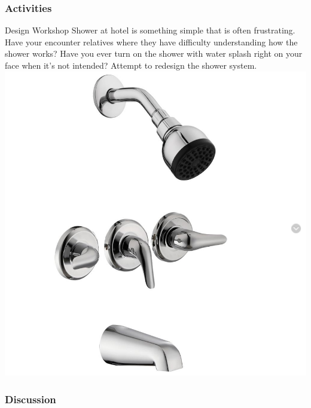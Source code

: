 \documentclass{beamer}
\begin{document}

\begin{frame}
	\frametitle{Activities}
	\begin{block}{Design Workshop}
		\footnotesize
		Shower at hotel is something simple that is often frustrating.  Have your encounter relatives where they have difficulty understanding how the shower works?  Have you ever turn on the shower with water splash right on your face when it's not intended?  Attempt to redesign the shower system. \\
		\centering
		\includegraphics[width=.3\linewidth]{faucet}
	\end{block}
\end{frame}


\begin{frame}
	\frametitle{Discussion}
\end{frame}

%	
\end{document}
